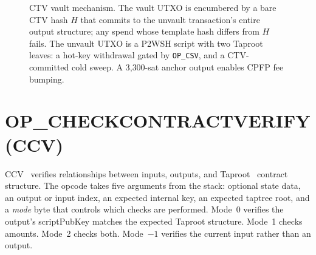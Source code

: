 \begin{figure}[t]
{}
\caption{CTV vault mechanism. The vault UTXO is encumbered by a bare CTV hash $H$
that commits to the unvault transaction's entire output structure; any spend
whose template hash differs from $H$ fails. The unvault UTXO is a P2WSH script
with two Taproot leaves: a hot-key withdrawal gated by \texttt{OP\_CSV}, and a
CTV-committed cold sweep. A 3{,}300-sat anchor output enables CPFP fee bumping.}
\label{fig:ctv_mechanism}
\end{figure}

\section{OP\_CHECKCONTRACTVERIFY (CCV)} \label{se:ccv}

CCV~\cite{BIP443} verifies relationships between inputs, outputs, and
Taproot~\cite{BIP341, BIP342} contract structure. The opcode takes five arguments from the stack: optional state data, an
output or input index, an expected internal key, an expected taptree root, and a
\emph{mode} byte that controls which checks are performed. Mode~0 verifies the output's
scriptPubKey matches the expected Taproot structure. Mode~1 checks amounts. Mode~2
checks both. Mode~$-1$ verifies the current input rather than an output.

